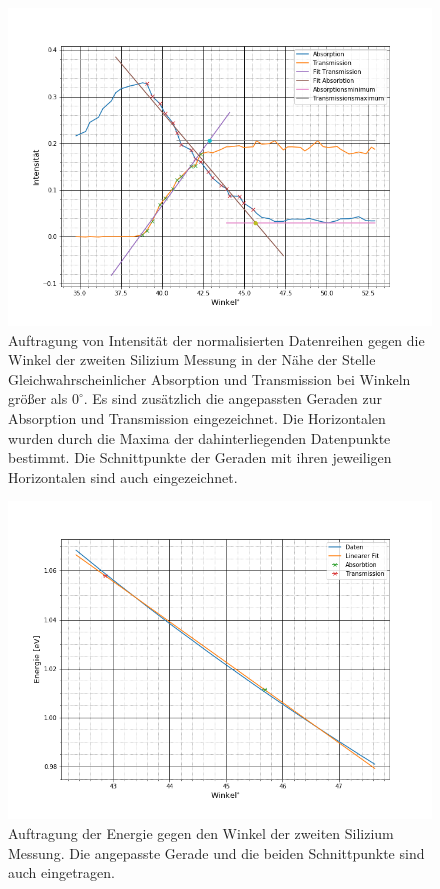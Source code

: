 \begin{figure}
	\includegraphics[scale=0.5]{Bilder/anhang/si_2_r}
	\centering
	\caption[Geraden Anpassungen 2. Silizium Messung rechts]{\small Auftragung von Intensität der normalisierten Datenreihen gegen die  Winkel der zweiten Silizium Messung in der Nähe der Stelle Gleichwahrscheinlicher Absorption und Transmission bei Winkeln größer als $0^\circ$. Es sind zusätzlich die angepassten Geraden zur Absorption und Transmission eingezeichnet. Die Horizontalen wurden durch die Maxima der dahinterliegenden Datenpunkte bestimmt. Die Schnittpunkte der Geraden mit ihren jeweiligen Horizontalen sind auch eingezeichnet.}
	\label{si_2_r}
\end{figure}
\begin{figure}
	\includegraphics[scale=0.5]{Bilder/anhang/si_2_l_energie}
	\centering
	\caption[Energiebestimmung 2. Si Messung links]{\small Auftragung der Energie gegen den Winkel der zweiten Silizium Messung. Die angepasste Gerade und die beiden Schnittpunkte sind auch eingetragen.}
\end{figure}
